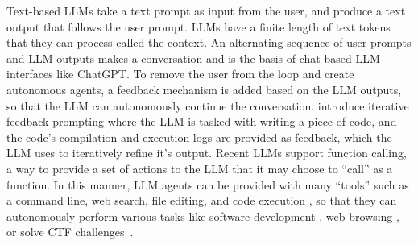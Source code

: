 


Text-based LLMs take a text prompt as input from the user, and produce a text output that follows the user prompt.
LLMs have a finite length of text tokens that they can process called the context.
An alternating sequence of user prompts and LLM outputs makes a conversation and is the basis of chat-based LLM interfaces like ChatGPT.
To remove the user from the loop and create autonomous agents, a feedback mechanism is added based on the LLM outputs, so that the LLM can autonomously continue the conversation.
\citet{yang2023intercode} introduce iterative feedback prompting where the LLM is tasked with writing a piece of code, and the code's compilation and execution logs are provided as feedback, which the LLM uses to iteratively refine it's output.
Recent LLMs support function calling, a way to provide a set of actions to the LLM that it may choose to ``call'' as a function.
In this manner, LLM agents can be provided with many ``tools'' such as a command line, web search, file editing, and code execution \cite{wang2024surveyllmagents}, so that they can autonomously perform various tasks like software development \cite{yang2024sweagent}, web browsing \cite{yoran2024assistantbench}, or solve CTF challenges~\cite{shao2024nyu, abramovich2024enigma}.

